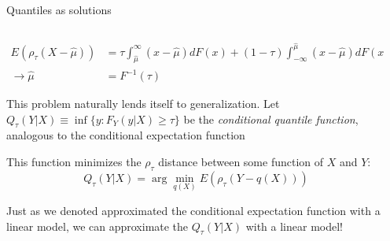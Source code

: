 \documentclass[notes,11pt, aspectratio=169]{beamer}
\newenvironment{wideitemize}{\itemize\addtolength{\itemsep}{10pt}}{\enditemize}
\begin{document}
\begin{frame}{Quantiles as solutions}
  \begin{columns}[T] %
\begin{column}{.9\textwidth}
  \begin{align*}
    E(\rho_\tau(X - \hat{\mu})) &= \tau \int_{\hat{\mu}}^{\infty} (x - \hat{\mu}) dF(x) + (1-\tau) \int^{\hat{\mu}}_{-\infty} (x - \hat{\mu}) dF(x)\\
\rightarrow   \hat{\mu} &= F^{-1}(\tau) 
    \end{align*}
    \begin{wideitemize}
    \item This problem naturally lends itself to generalization. Let $Q_{\tau}(Y |X ) \equiv \inf\{y : F_{Y}(y | X)\geq \tau\}$ be the \emph{conditional quantile function}, analogous to the conditional expectation function
    \item This function minimizes the $\rho_{\tau}$ distance between some function of $X$ and $Y$:
      \begin{equation*}
        Q_{\tau}(Y | X) = \arg\min_{q(X)} E(\rho_{\tau}(Y - q(X)))
      \end{equation*}
    \item Just as we denoted approximated the conditional expectation
      function with a linear model, we can approximate the
      $Q_{\tau}(Y|X)$ with a linear model!
    \end{wideitemize}
  \end{column}%
  \hfill%
  \begin{column}{.3\textwidth}
  \end{column}
\end{columns}
\end{frame}
\end{document}

